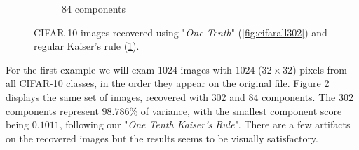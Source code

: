 \documentclass{article} %
\begin{document}
\begin{figure}[h]
\begin{subfigure}{.5\textwidth}
  \caption{$84$ components}
  \label{fig:cifarall84}
\end{subfigure}
\caption{CIFAR-10 images recovered using "\emph{One Tenth}" (\ref{fig:cifarall302}) and regular Kaiser's rule (\ref{fig:cifarall84}).}
\label{fig:sampleCifar10}
\end{figure}

For the first example we will exam $1024$ images with $1024$ ($32\times 32$) pixels from all CIFAR-10 classes, in the order they appear on the original file. Figure \ref{fig:sampleCifar10} displays the same set of images, recovered with $302$ and $84$ components. The $302$ components represent $98.786\%$ of variance, with the smallest component score being $0.1011$, following our "\emph{One Tenth Kaiser's Rule}". There are a few artifacts on the recovered images but the results seems to be visually satisfactory.\par
\end{document}
